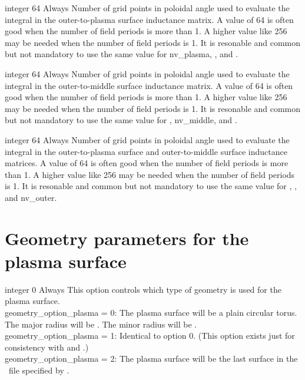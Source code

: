\myhrule

{integer}
{64}
{Always}
{Number of grid points in poloidal angle used to evaluate the integral  in the outer-to-plasma surface inductance matrix.
A value of 64 is often good when the number of field periods is more than 1. A higher value like 256 may be needed when the number of field periods is 1.
It is resonable and common but not mandatory to use the same value for nv\_plasma, , and .}

\myhrule

{integer}
{64}
{Always}
{Number of grid points in poloidal angle used to evaluate the integral  in the outer-to-middle surface inductance matrix.
A value of 64 is often good when the number of field periods is more than 1. A higher value like 256 may be needed when the number of field periods is 1.
It is resonable and common but not mandatory to use the same value for , nv\_middle, and .}

\myhrule

{integer}
{64}
{Always}
{Number of grid points in poloidal angle used to evaluate the integral  in the outer-to-plasma surface and outer-to-middle surface inductance matrices.
A value of 64 is often good when the number of field periods is more than 1. A higher value like 256 may be needed when the number of field periods is 1.
It is resonable and common but not mandatory to use the same value for , , and nv\_outer.}

\section{Geometry parameters for the plasma surface}

{integer}
{0}
{Always}
{This option controls which type of geometry is used for the plasma surface.\\

{\ttfamily geometry\_option\_plasma} = 0: The plasma surface will be a plain circular torus. The major radius will be .
     The minor radius will be .\\

{\ttfamily geometry\_option\_plasma} = 1: Identical to option 0. (This option exists just for consistency with  and .)\\

{\ttfamily geometry\_option\_plasma} = 2: The plasma surface will be the last surface in the \vmec~file specified by .
}

